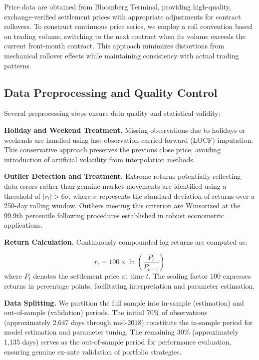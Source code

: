 \documentclass[
  10pt,
  a4paper,
]{article}
\begin{document}
Price data are obtained from Bloomberg Terminal, providing high-quality,
exchange-verified settlement prices with appropriate adjustments for
contract rollovers. To construct continuous price series, we employ a
roll convention based on trading volume, switching to the next contract
when its volume exceeds the current front-month contract. This approach
minimizes distortions from mechanical rollover effects while maintaining
consistency with actual trading patterns.

\subsection{Data Preprocessing and Quality
Control}\label{data-preprocessing-and-quality-control}

Several preprocessing steps ensure data quality and statistical
validity:

\textbf{Holiday and Weekend Treatment.} Missing observations due to
holidays or weekends are handled using last-observation-carried-forward
(LOCF) imputation. This conservative approach preserves the previous
close price, avoiding introduction of artificial volatility from
interpolation methods.

\textbf{Outlier Detection and Treatment.} Extreme returns potentially
reflecting data errors rather than genuine market movements are
identified using a threshold of \(|r_t| > 6\sigma\), where \(\sigma\)
represents the standard deviation of returns over a 250-day rolling
window. Outliers meeting this criterion are Winsorized at the 99.9th
percentile following procedures established in robust econometric
applications.

\textbf{Return Calculation.} Continuously compounded log returns are
computed as:

\[
r_t = 100 \times \ln\left(\frac{P_t}{P_{t-1}}\right)
\] where \(P_t\) denotes the settlement price at time \(t\). The scaling
factor 100 expresses returns in percentage points, facilitating
interpretation and parameter estimation.

\textbf{Data Splitting.} We partition the full sample into in-sample
(estimation) and out-of-sample (validation) periods. The initial 70\% of
observations (approximately 2,647 days through mid-2018) constitute the
in-sample period for model estimation and parameter tuning. The
remaining 30\% (approximately 1,135 days) serves as the out-of-sample
period for performance evaluation, ensuring genuine ex-ante validation
of portfolio strategies.
\end{document}
